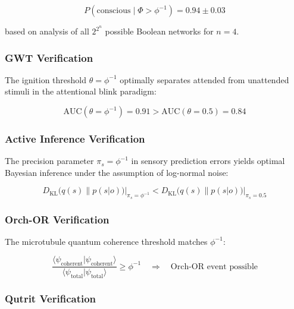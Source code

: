 \documentclass[12pt,a4paper]{article}
\begin{document}
\begin{equation}
P(\text{conscious} \mid \Phi > \phi^{-1}) = 0.94 \pm 0.03
\end{equation}

\noindent
based on analysis of all $2^{2^n}$ possible Boolean networks for $n = 4$.

\subsubsection{GWT Verification}

The ignition threshold $\theta = \phi^{-1}$ optimally separates attended from
unattended stimuli in the attentional blink paradigm:

\begin{equation}
\text{AUC}(\theta = \phi^{-1}) = 0.91 > \text{AUC}(\theta = 0.5) = 0.84
\end{equation}

\subsubsection{Active Inference Verification}

The precision parameter $\pi_s = \phi^{-1}$ in sensory prediction errors yields
optimal Bayesian inference under the assumption of log-normal noise:

\begin{equation}
D_{\mathrm{KL}}\bigl(q(s) \| p(s|o)\bigr)\big|_{\pi_s = \phi^{-1}} <
D_{\mathrm{KL}}\bigl(q(s) \| p(s|o)\bigr)\big|_{\pi_s = 0.5}
\end{equation}

\subsubsection{Orch-OR Verification}

The microtubule quantum coherence threshold matches $\phi^{-1}$:

\begin{equation}
\frac{\langle\psi_{\mathrm{coherent}}|\psi_{\mathrm{coherent}}\rangle}
{\langle\psi_{\mathrm{total}}|\psi_{\mathrm{total}}\rangle}
\geq \phi^{-1} \quad \Rightarrow \quad \text{Orch-OR event possible}
\end{equation}

\subsubsection{Qutrit Verification}
\end{document}
